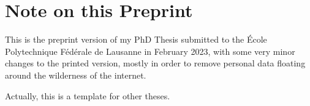 \cleardoublepage

\chapter*{Note on this Preprint}

This is the preprint version of my PhD Thesis submitted to the \'Ecole Polytechnique F\'ed\'erale 
de Lausanne in February 2023, with some very minor changes to the printed version, mostly in order 
to remove personal data floating around the wilderness of the internet.

Actually, this is a template for other theses.
